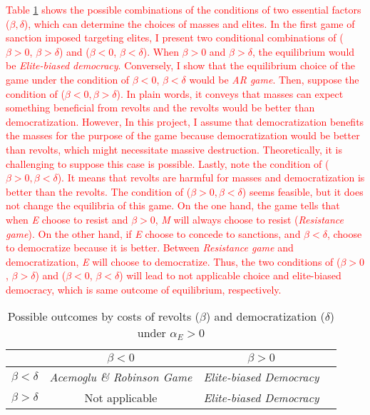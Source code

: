 \documentclass[11pt, letterpage]{article}
\begin{document}
\textcolor{red}{Table \ref{tab:table1} shows the possible combinations of the conditions of two essential factors ($\beta, \delta$), which can determine the choices of masses and elites. In the first game of sanction imposed targeting elites, I present two conditional combinations of ($\beta > 0$, $\beta > \delta$) and ($\beta < 0$, $\beta < \delta$). When $\beta > 0$ and $\beta > \delta$, the equilibrium would be \textit{Elite-biased democracy}. Conversely, I show that the equilibrium choice of the game under the condition of $\beta < 0$, $\beta < \delta$ would be \textit{AR game}. Then, suppose the condition of ($\beta < 0, \beta > \delta$). In plain words, it conveys that masses can expect something beneficial from revolts and the revolts would be better than democratization. However, In this project, I assume that democratization benefits the masses for the purpose of the game because democratization would be better than revolts, which might necessitate massive destruction. Theoretically, it is challenging to suppose this case is possible. Lastly, note the condition of ($\beta > 0, \beta < \delta$). It means that revolts are harmful for masses and democratization is better than the revolts. The condition of ($\beta > 0, \beta < \delta$) seems feasible, but it does not change the equilibria of this game. On the one hand, the game tells that when \textit{E} choose to resist and $\beta>0$,  \textit{M} will always choose to resist (\textit{Resistance game}). On the other hand, if \textit{E} choose to concede to sanctions, and $\beta < \delta$,  choose to democratize because it is better. Between \textit{Resistance game} and democratization, \textit{E} will choose to democratize. Thus, the two conditions of ($\beta > 0$, $\beta > \delta$) and ($\beta < 0$, $\beta < \delta$) will lead to not applicable choice and elite-biased democracy, which is same outcome of equilibrium, respectively.}

\begin{table}[!ht]
	\centering
		\begin{tabular}{l*{3}{c}}
			\toprule
					    	       &\multicolumn{1}{c}{$\beta < 0$}		&\multicolumn{1}{c}{$\beta > 0$} \\
			\midrule
			$\beta < \delta$	   & \textit{Acemoglu \& Robinson Game} & \textit{Elite-biased Democracy}\\
			$\beta > \delta$	   & Not applicable					 	& \textit{Elite-biased Democracy}\\
			\bottomrule
		\end{tabular}
	\caption{Possible outcomes by costs of revolts ($\beta$) and democratization ($\delta$) under $\alpha_{E} > 0$}
	\label{tab:table1}
\end{table}
\end{document}
